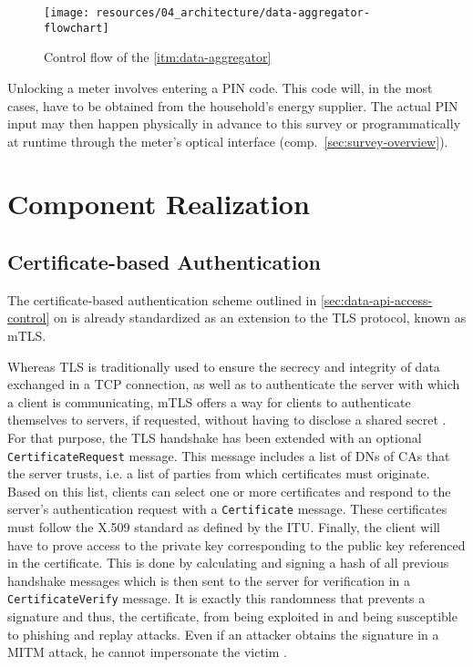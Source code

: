 \begin{figure}[hbt]
  \centering
  \texttt{[image: resources/04\_architecture/data-aggregator-flowchart]}
  \caption{Control flow of the \ref{itm:data-aggregator}}
  \label{fig:data-aggregator-control-flow}
\end{figure}

\FloatBarrier

Unlocking a meter involves entering a \acs{PIN} code. This code will, in the most cases, have to be obtained from the household's energy supplier. The actual \acs{PIN} input may then happen physically in advance to this survey or programmatically at runtime through the meter's optical interface (comp.~\autoref{sec:survey-overview}).


\section{Component Realization}
\label{sec:component-realization}


\subsection{Certificate-based Authentication}
\label{sec:certificate-based-authentication}

The certificate-based authentication scheme outlined in \autoref{sec:data-api-access-control} on  is already standardized as an extension to the \acs{TLS} protocol, known as \ac{mTLS}.

Whereas \acs{TLS} is traditionally used to ensure the secrecy and integrity of data exchanged in a \acs{TCP} connection, as well as to authenticate the server with which a client is communicating, \acs{mTLS} offers a way for clients to authenticate themselves to servers, if requested, without having to disclose a shared secret \cite[p.~1]{parsovs2013practical}. For that purpose, the \acs{TLS} handshake has been extended with an optional \texttt{CertificateRequest} message. This message includes a list of \acp{DN} of \acp{CA} that the server trusts, i.e. a list of parties from which certificates must originate. Based on this list, clients can select one or more certificates and respond to the server's authentication request with a \texttt{Certificate} message. These certificates must follow the X.509 standard as defined by the \ac{ITU}. Finally, the client will have to prove access to the private key corresponding to the public key referenced in the certificate. This is done by calculating and signing a hash of all previous handshake messages which is then sent to the server for verification in a \texttt{CertificateVerify} message. It is exactly this randomness that prevents a signature and thus, the certificate, from being exploited in and being susceptible to phishing and replay attacks. Even if an attacker obtains the signature in a \acs{MITM} attack, he cannot impersonate the victim \cite[p.~2]{parsovs2013practical}.

